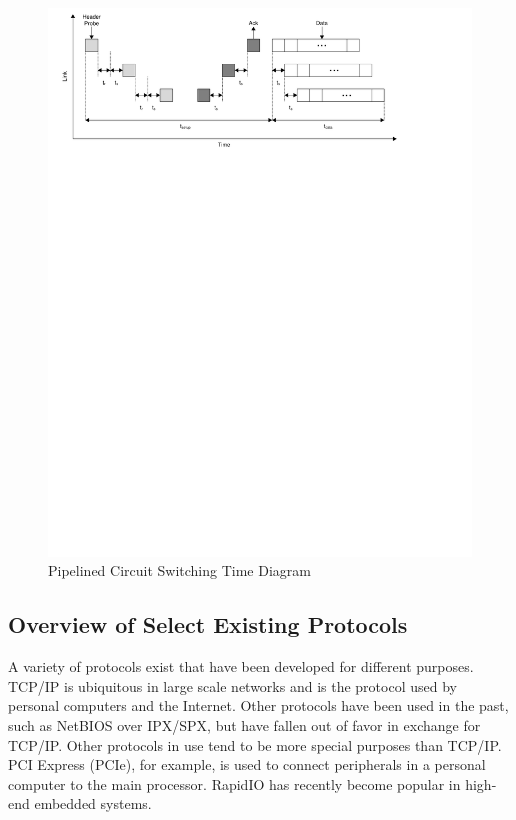 \begin{figure}[ptb]
	\begin{centering}
		\includegraphics[scale=0.8]{Protocol/Figures/protocol-pcs_time_diagram.pdf}
		\caption[Pipelined Circuit Switching Time Diagram]{Pipelined Circuit Switching Time Diagram \cite{ref:1997-duato-interconnection_networks}}
		\label{fig:protocol:pcs_time_diagram}
	\end{centering}
\end{figure}

\subsection{Overview of Select Existing Protocols}\label{sec:protocol:background:protocols}

A variety of protocols exist that have been developed for different purposes. TCP/IP is ubiquitous in large scale networks and is the protocol used by personal computers and the Internet. Other protocols have been used in the past, such as NetBIOS over IPX/SPX, but have fallen out of favor in exchange for TCP/IP. Other protocols in use tend to be more special purposes than TCP/IP. PCI Express (PCIe), for example, is used to connect peripherals in a personal computer to the main processor. RapidIO has recently become popular in high-end embedded systems.

